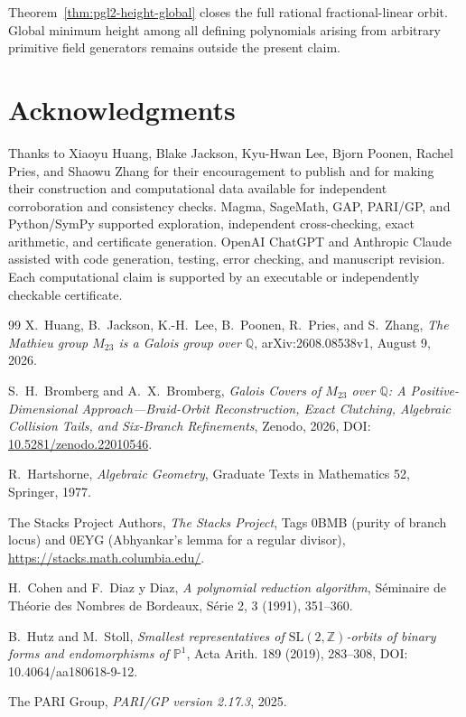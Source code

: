 \documentclass[11pt]{article}
\newcommand{\Q}{\mathbb Q}
\begin{document}
Theorem~\ref{thm:pgl2-height-global} closes the full rational fractional-linear orbit.  Global minimum height among all defining polynomials arising from arbitrary primitive field generators remains outside the present claim.
\section*{Acknowledgments}
Thanks to Xiaoyu Huang, Blake Jackson, Kyu-Hwan Lee, Bjorn Poonen, Rachel Pries, and Shaowu Zhang for their encouragement to publish and for making their construction and computational data available for independent corroboration and consistency checks.  Magma, SageMath, GAP, PARI/GP, and Python/SymPy supported exploration, independent cross-checking, exact arithmetic, and certificate generation.  OpenAI ChatGPT and Anthropic Claude assisted with code generation, testing, error checking, and manuscript revision.  Each computational claim is supported by an executable or independently checkable certificate.
\begin{thebibliography}{99}
\small
\setlength{\itemsep}{0.18em}
X.~Huang, B.~Jackson, K.-H.~Lee, B.~Poonen, R.~Pries, and S.~Zhang,
\emph{The Mathieu group $M_{23}$ is a Galois group over $\Q$},
arXiv:2608.08538v1, August 9, 2026.

S.~H.~Bromberg and A.~X.~Bromberg,
\emph{Galois Covers of $M_{23}$ over $\Q$: A Positive-Dimensional Approach---Braid-Orbit Reconstruction, Exact Clutching, Algebraic Collision Tails, and Six-Branch Refinements},
Zenodo, 2026, DOI: \href{https://doi.org/10.5281/zenodo.22010546}{10.5281/zenodo.22010546}.

R.~Hartshorne,
\emph{Algebraic Geometry},
Graduate Texts in Mathematics 52, Springer, 1977.

The Stacks Project Authors,
\emph{The Stacks Project},
Tags 0BMB (purity of branch locus) and 0EYG (Abhyankar's lemma for a regular divisor),
\url{https://stacks.math.columbia.edu/}.


H.~Cohen and F.~Diaz y Diaz,
\emph{A polynomial reduction algorithm},
S\'eminaire de Th\'eorie des Nombres de Bordeaux, S\'erie 2, 3 (1991), 351--360.

B.~Hutz and M.~Stoll,
\emph{Smallest representatives of $\mathrm{SL}(2,\mathbb Z)$-orbits of binary forms and endomorphisms of $\mathbb P^1$},
Acta Arith. 189 (2019), 283--308, DOI: 10.4064/aa180618-9-12.

The PARI Group,
\emph{PARI/GP version 2.17.3},
2025.
\end{thebibliography}
\end{document}
